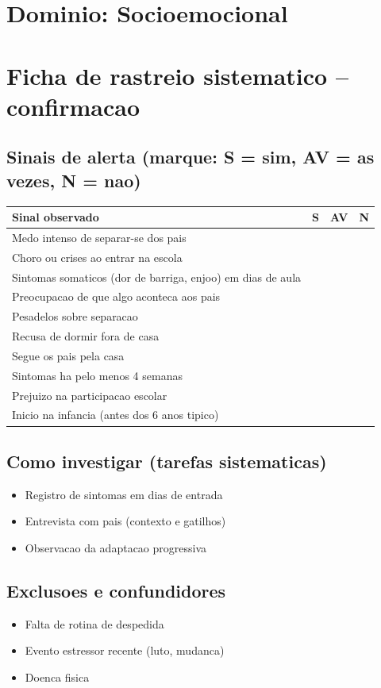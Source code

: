\documentclass[a4paper,11pt]{book}
\begin{document}
\section*{Dominio: Socioemocional}
\section*{Ficha de rastreio sistematico -- confirmacao}
\subsection*{Sinais de alerta (marque: S = sim, AV = as vezes, N = nao)}
\begin{tabular}{@{}p{11.5cm}ccc@{}}\toprule
Sinal observado & S & AV & N \\\midrule
Medo intenso de separar-se dos pais & & & \\
Choro ou crises ao entrar na escola & & & \\
Sintomas somaticos (dor de barriga, enjoo) em dias de aula & & & \\
Preocupacao de que algo aconteca aos pais & & & \\
Pesadelos sobre separacao & & & \\
Recusa de dormir fora de casa & & & \\
Segue os pais pela casa & & & \\
Sintomas ha pelo menos 4 semanas & & & \\
Prejuizo na participacao escolar & & & \\
Inicio na infancia (antes dos 6 anos tipico) & & & \\
\bottomrule\end{tabular}
\subsection*{Como investigar (tarefas sistematicas)}
\begin{itemize}
\item Registro de sintomas em dias de entrada
\item Entrevista com pais (contexto e gatilhos)
\item Observacao da adaptacao progressiva
\end{itemize}
\subsection*{Exclusoes e confundidores}
\begin{itemize}
\item Falta de rotina de despedida
\item Evento estressor recente (luto, mudanca)
\item Doenca fisica
\end{itemize}
\end{document}
